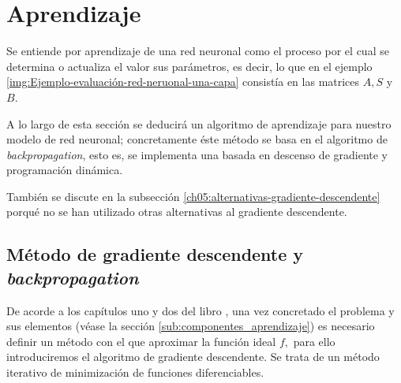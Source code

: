 \section{Aprendizaje}  
\label{ch05:aprendizaje}

Se entiende por aprendizaje de una red neuronal como el proceso 
por el cual se determina o actualiza el valor sus parámetros, es decir, lo que en el ejemplo 
\ref{img:Ejemplo-evaluación-red-neruonal-una-capa} consistía en las matrices $A,S$ y $B$.

A lo largo de esta sección se deducirá un algoritmo de aprendizaje para nuestro modelo de red neuronal; concretamente éste método se basa en el algoritmo de \textit{backpropagation}, esto es, se implementa una  basada en descenso de gradiente y programación dinámica. 

También se discute en la subsección \ref{ch05:alternativas-gradiente-descendente} porqué no se han utilizado otras alternativas al gradiente descendente.  


\subsection{Método de gradiente descendente y \textit{backpropagation}} \label{sec:gradiente-descendente}

De acorde a los capítulos uno y dos del libro  \cite{learning-from-data-1-2},
 una vez concretado el problema y sus elementos 
(véase la sección \ref{sub:componentes_aprendizaje}) es necesario definir un método con 
el que aproximar la función ideal $f,$ para ello introduciremos el algoritmo de gradiente descendente. Se trata de un método iterativo de minimización de funciones diferenciables. 


